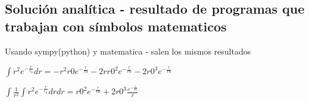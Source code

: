 \documentclass[12pt]{book}
\begin{document}
\subsection{Solución analítica - resultado de programas que  trabajan con símbolos matematicos}

\begin{description}
\item Usando sympy(python) y matematica - salen los mismos resultados
\item  $\int{r^2 e^{-\frac{r}{r_0}}dr} =  -r^2 r0 e^{-\frac{r}{r0}} - 2 r r0^2 e^{-\frac{r}{r0}} - 2 r0^3  e^{-\frac{r}{r0}} $
\item  $\int{\frac{1}{r^2} \int{r^2 e^{-\frac{r}{r_0}}dr}dr} =  r0^2 e^{-\frac{r}{r0}} + 2 r0^3 \frac{e^{-\frac{r}{r0}}}{r} $
\end{description}
\end{document}
